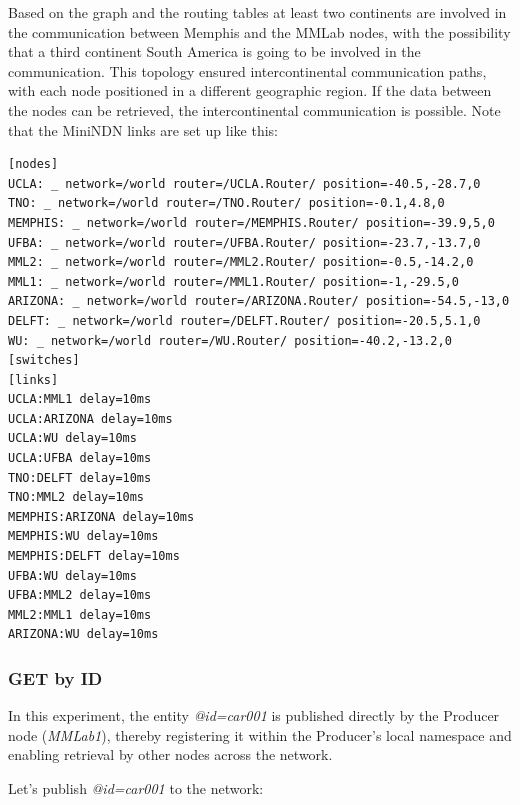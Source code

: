 \documentclass{article}
\begin{document}
Based on the graph and the routing tables at least two continents are involved in the communication between Memphis and the MMLab nodes, with the possibility that a third continent South America is going to be involved in the communication. This topology ensured intercontinental communication paths, with each node positioned in a different geographic region. If the data between the nodes can be retrieved, the intercontinental communication is possible. Note that the MiniNDN links are set up like this:
\pagebreak
\begin{lstlisting}[language=minindnconf, caption={MiniNDN config file for the testbed nodes}, label={lst:minindn-conf-testbed}]
[nodes]
UCLA: _ network=/world router=/UCLA.Router/ position=-40.5,-28.7,0
TNO: _ network=/world router=/TNO.Router/ position=-0.1,4.8,0
MEMPHIS: _ network=/world router=/MEMPHIS.Router/ position=-39.9,5,0
UFBA: _ network=/world router=/UFBA.Router/ position=-23.7,-13.7,0
MML2: _ network=/world router=/MML2.Router/ position=-0.5,-14.2,0
MML1: _ network=/world router=/MML1.Router/ position=-1,-29.5,0
ARIZONA: _ network=/world router=/ARIZONA.Router/ position=-54.5,-13,0
DELFT: _ network=/world router=/DELFT.Router/ position=-20.5,5.1,0
WU: _ network=/world router=/WU.Router/ position=-40.2,-13.2,0
[switches]
[links]
UCLA:MML1 delay=10ms
UCLA:ARIZONA delay=10ms
UCLA:WU delay=10ms
UCLA:UFBA delay=10ms
TNO:DELFT delay=10ms
TNO:MML2 delay=10ms
MEMPHIS:ARIZONA delay=10ms
MEMPHIS:WU delay=10ms
MEMPHIS:DELFT delay=10ms
UFBA:WU delay=10ms
UFBA:MML2 delay=10ms
MML2:MML1 delay=10ms
ARIZONA:WU delay=10ms 
\end{lstlisting}

\subsubsection{GET by ID}

In this experiment, the entity \textit{@id=car001} is published directly by the Producer node (\textit{MMLab1}), thereby registering it within the Producer’s local namespace and enabling retrieval by other nodes across the network.

Let's publish \textit{@id=car001} to the network: 
\end{document}
